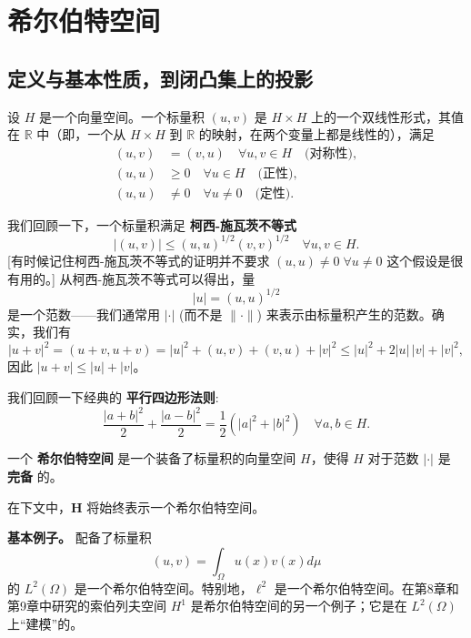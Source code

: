 \chapter{希尔伯特空间}

\section{定义与基本性质，到闭凸集上的投影}
\label{sec:5.1}

\begin{definition}
设 $H$ 是一个向量空间。一个标量积 $(u, v)$ 是 $H \times H$ 上的一个双线性形式，其值在 $\mathbb{R}$ 中（即，一个从 $H \times H$ 到 $\mathbb{R}$ 的映射，在两个变量上都是线性的），满足
\begin{align*}
(u, v) &= (v, u) \quad \forall u, v \in H \quad \text{(对称性)}, \\
(u, u) &\ge 0 \quad \forall u \in H \quad \text{(正性)}, \\
(u, u) &\ne 0 \quad \forall u \ne 0 \quad \text{(定性)}.
\end{align*}
\end{definition}

我们回顾一下，一个标量积满足 \textbf{柯西-施瓦茨不等式}
\[
|(u, v)| \le (u, u)^{1/2} (v, v)^{1/2} \quad \forall u, v \in H.
\]
[有时候记住柯西-施瓦茨不等式的证明并不要求 $(u, u) \ne 0 \; \forall u \ne 0$ 这个假设是很有用的。] 从柯西-施瓦茨不等式可以得出，量
\[
\boxed{|u| = (u, u)^{1/2}}
\]
是一个范数——我们通常用 $|\cdot|$ (而不是 $\|\cdot\|$) 来表示由标量积产生的范数。确实，我们有
\[
|u + v|^2 = (u + v, u + v) = |u|^2 + (u, v) + (v, u) + |v|^2 \le |u|^2 + 2|u|\,|v| + |v|^2,
\]
因此 $|u + v| \le |u| + |v|$。

我们回顾一下经典的 \textbf{平行四边形法则}:
\begin{equation} \label{eq:5.1}
\frac{|a+b|^2}{2} + \frac{|a-b|^2}{2} = \frac{1}{2}(|a|^2 + |b|^2) \quad \forall a, b \in H.
\end{equation}

\begin{definition}
一个 \textbf{希尔伯特空间} 是一个装备了标量积的向量空间 $H$，使得 $H$ 对于范数 $|\cdot|$ 是 \textbf{完备} 的。
\end{definition}

在下文中，$\mathbf{H}$ 将始终表示一个希尔伯特空间。

\textbf{基本例子。} 配备了标量积
\[
(u, v) = \int_\Omega u(x)v(x) d\mu
\]
的 $L^2(\Omega)$ 是一个希尔伯特空间。特别地，$\ell^2$ 是一个希尔伯特空间。在第8章和第9章中研究的索伯列夫空间 $H^1$ 是希尔伯特空间的另一个例子；它是在 $L^2(\Omega)$ 上“建模”的。

